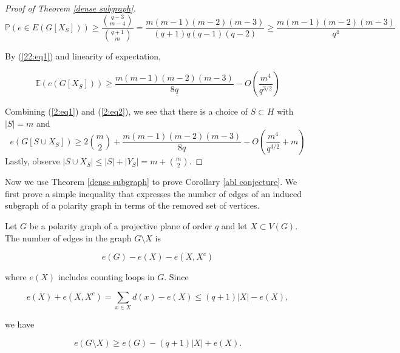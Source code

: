\documentclass[12pt]{article}
\begin{document}
\begin{proof}[Proof of Theorem \ref{dense subgraph}]
    $$ \mathbb{P} ( e \in E (G[  X_S ] ) ) \geq \frac{ \binom{q-3}{m-4} }{ \binom{q+1}{m}} = \frac{ m ( m - 1) ( m - 2)( m - 3) }{ (q + 1) q ( q - 1) ( q- 2) } \geq \frac{ m ( m -1) ( m -2) ( m - 3) }{q^4} $$

    By (\ref{22:eq1}) and linearity of expectation,

    \begin{equation}\label{2:eq2}
        \mathbb{E} ( e (G [ X_S] ) ) \geq \frac{ m ( m - 1)(m-2)(m-3) }{8q} - O \left( \frac{m^4}{q^{3/2}} \right)
    \end{equation}

    Combining (\ref{2:eq1}) and (\ref{2:eq2}), we see that there is a choice of $S \subset H$ with $|S| = m$ and
    $$ e ( G[ S \cup X_S ] ) \geq 2 \binom{ m }{2} + \frac{ m ( m - 1)(m-2)(m-3) }{8q} - O \left( \frac{m^4}{q^{3/2}}+m \right) $$
    Lastly, observe $|S \cup X_S| \leq |S| + |Y_S| = m + \binom{m}{2}$.
\end{proof}

Now we use Theorem \ref{dense subgraph} to prove Corollary \ref{abl conjecture}.  We first prove a simple inequality that
expresses the number of edges of an induced subgraph of a polarity graph in terms of the removed set of vertices.

Let $G$ be a polarity graph of a projective plane of order $q$ and let $X\subset V(G)$.
The number of edges in the graph $G \setminus X$ is

$$ e(G) - e(X) - e(X, X^c) $$

where $e(X)$ includes counting loops in $G$. Since

$$ e(X) + e(X, X^c) = \sum_{x\in X} d(x) - e(X) \leq (q+1)|X| - e(X), $$

we have

\begin{equation}\label{2:eq3}
    e(G \setminus X ) \geq e(G) - (q + 1) |X| + e(X).
\end{equation}
\end{document}

